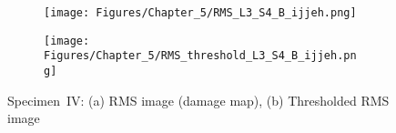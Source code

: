 \begin{figure} [!h]
	\begin{subfigure}[b]{.5\textwidth}
		\centering
		\texttt{[image: Figures/Chapter\_5/RMS\_L3\_S4\_B\_ijjeh.png]}
		\caption{} 
		\label{fig:RMS_L3_S4_B_ijjeh}
	\end{subfigure}
		\hfill
	\begin{subfigure}[b]{.42\textwidth}
		\centering
		\texttt{[image: Figures/Chapter\_5/RMS\_threshold\_L3\_S4\_B\_ijjeh.png]}
		\caption{} 
		\label{fig:RMS_threshold_L3_S4_B_ijjeh}
	\end{subfigure}
	\caption{Specimen~IV: (a) RMS image (damage map), (b) Thresholded RMS image}
	\label{fig:RMS_L3_S4_B__images}
\end{figure} 
\clearpage